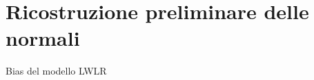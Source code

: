 
\section{Ricostruzione preliminare delle normali}
\begin{frame}{Bias del modello LWLR}

\end{frame}